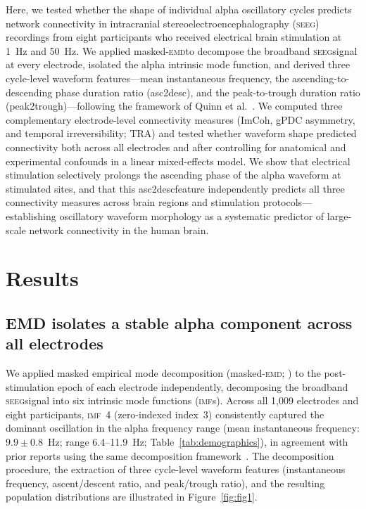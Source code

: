 \documentclass[11pt, a4paper]{article}
\newcommand{\imf}{\textsc{imf}}
\newcommand{\seeg}{\textsc{seeg}}
\newcommand{\emd}{\textsc{emd}}
\newcommand{\asc}{asc2desc}
\newcommand{\ptr}{peak2trough}
\begin{document}
Here, we tested whether the shape of individual alpha oscillatory cycles
predicts network connectivity in intracranial stereoelectroencephalography
(\seeg) recordings from eight participants who received electrical brain
stimulation at 1~Hz and 50~Hz. We applied masked-\emd to decompose the
broadband \seeg signal at every electrode, isolated the alpha intrinsic mode
function, and derived three cycle-level waveform features---mean instantaneous
frequency, the ascending-to-descending phase duration ratio (\asc), and the
peak-to-trough duration ratio (\ptr)---following the framework of Quinn et
al.~\citeyearpar{quinn2021within}. We computed three complementary
electrode-level connectivity measures (ImCoh, gPDC asymmetry, and temporal
irreversibility; TRA) and tested whether waveform shape predicted connectivity
both across all electrodes and after controlling for anatomical and experimental
confounds in a linear mixed-effects model. We show that electrical stimulation
selectively prolongs the ascending phase of the alpha waveform at stimulated
sites, and that this \asc feature independently predicts all three connectivity
measures across brain regions and stimulation protocols---establishing
oscillatory waveform morphology as a systematic predictor of large-scale
network connectivity in the human brain.

\section{Results}

\subsection{EMD isolates a stable alpha component across all electrodes}

We applied masked empirical mode decomposition (masked-\emd;
\citealt{quinn2021within}) to the post-stimulation epoch of each electrode
independently, decomposing the broadband \seeg signal into six intrinsic mode
functions (\imf{}s). Across all 1,009 electrodes and eight participants,
\imf{}~4 (zero-indexed index~3) consistently captured the dominant oscillation
in the alpha frequency range (mean instantaneous frequency:
$9.9 \pm 0.8$~Hz; range 6.4--11.9~Hz; Table~\ref{tab:demographics}), in
agreement with prior reports using the same decomposition
framework~\citep{quinn2021within}. The decomposition procedure, the
extraction of three cycle-level waveform features (instantaneous frequency,
ascent/descent ratio, and peak/trough ratio), and the resulting population
distributions are illustrated in Figure~\ref{fig:fig1}.
\end{document}
